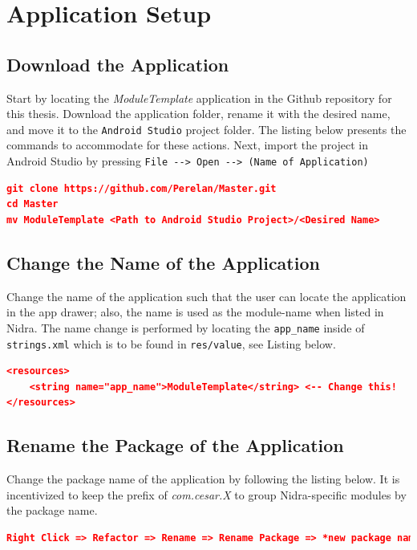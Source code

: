\section{Application Setup}

\subsection{Download the Application}
Start by locating the \textit{ModuleTemplate} application in the Github repository for this thesis. Download the application folder, rename it with the desired name, and move it to the \verb|Android Studio| project folder. The listing below presents the commands to accommodate for these actions. Next, import the project in Android Studio by pressing \verb|File --> Open --> (Name of Application)|

\begin{lstlisting}[language=json, caption={}, captionpos=b]
git clone https://github.com/Perelan/Master.git
cd Master
mv ModuleTemplate <Path to Android Studio Project>/<Desired Name>
\end{lstlisting}

\subsection{Change the Name of the Application}
Change the name of the application such that the user can locate the application in the app drawer; also, the name is used as the module-name when listed in Nidra. The name change is performed by locating the \verb|app_name| inside of \verb|strings.xml| which is to be found in \verb|res/value|, see Listing below. 

\begin{lstlisting}[language=json, caption={}, captionpos=b]
<resources>
    <string name="app_name">ModuleTemplate</string> <-- Change this!
</resources>
\end{lstlisting}

\subsection{Rename the Package of the Application}
Change the package name of the application by following the listing below. It is incentivized to keep the prefix of \textit{com.cesar.X} to group Nidra-specific modules by the package name. 

\begin{lstlisting}[language=json, caption={}, captionpos=b]
Right Click => Refactor => Rename => Rename Package => *new package name* => Refactor
\end{lstlisting}

